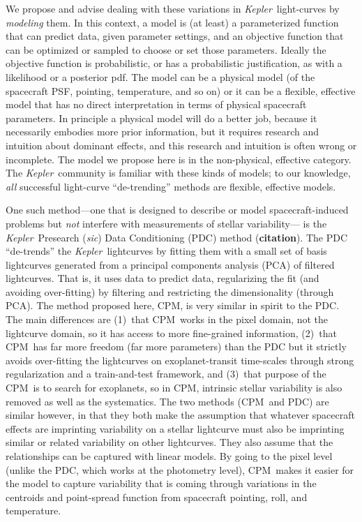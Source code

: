 \documentclass[12pt, preprint]{aastex}
\newcommand{\notenglish}[1]{\textit{#1}}
\newcommand{\sic}{\notenglish{sic}}
\newcommand{\project}[1]{\textsl{#1}}
\newcommand{\Kepler}{\project{Kepler}}
\newcommand{\name}{CPM}
\newcommand{\todo}[1]{\textbf{#1}}
\begin{document}
We propose and advise dealing with these variations in \Kepler\ light-curves by \emph{modeling} them.
In this context, a model is (at least) a parameterized function that can predict data, given parameter settings,
  and an objective function that can be optimized or sampled to choose or set those parameters.
Ideally the objective function is probabilistic, or has a probabilistic justification,
  as with a likelihood or a posterior pdf.
The model can be a physical model (of the spacecraft PSF, pointing, temperature, and so on)
  or it can be a flexible, effective model that has no direct interpretation in terms of physical spacecraft parameters.
In principle a physical model will do a better job,
  because it necessarily embodies more prior information,
  but it requires research and intuition about dominant effects,
  and this research and intuition is often wrong or incomplete.
The model we propose here is in the non-physical, effective category.
The \Kepler\ community is familiar with these kinds of models;
  to our knowledge, \emph{all} successful light-curve ``de-trending'' methods
  are flexible, effective models.

One such method---one that is designed to describe or model spacecraft-induced problems
  but \emph{not} interfere with measurements of stellar variability---%
  is the \Kepler\ Presearch (\sic) Data Conditioning (PDC) method (\todo{citation}).
The PDC ``de-trends'' the \Kepler\ lightcurves by fitting them with a small set of basis lightcurves
  generated from a principal components analysis (PCA) of filtered lightcurves.
That is, it uses data to predict data,
  regularizing the fit (and avoiding over-fitting) by filtering and restricting the dimensionality (through PCA).
The method proposed here, \name, is very similar in spirit to the PDC.
The main differences are
  (1)~that \name\ works in the pixel domain, not the lightcurve domain, so it has access to more fine-grained information,
  (2)~that \name\ has far more freedom (far more parameters) than the PDC
  but it strictly avoids over-fitting the lightcurves on exoplanet-transit time-scales
  through strong regularization and a train-and-test framework, and
  (3)~that purpose of the \name\ is to search for exoplanets, so in \name, intrinsic stellar
  variability is also removed as well as the systematics.
The two methods (\name\ and PDC) are similar however,
  in that they both make the assumption that whatever spacecraft effects are imprinting variability on a stellar lightcurve
  must also be imprinting similar or related variability on other lightcurves.
They also assume that the relationships can be captured with linear models.
By going to the pixel level (unlike the PDC, which works at the photometry level),
  \name\ makes it easier for the model to capture variability
  that is coming through variations in the centroids and point-spread function
  from spacecraft pointing, roll, and temperature.
\end{document}
